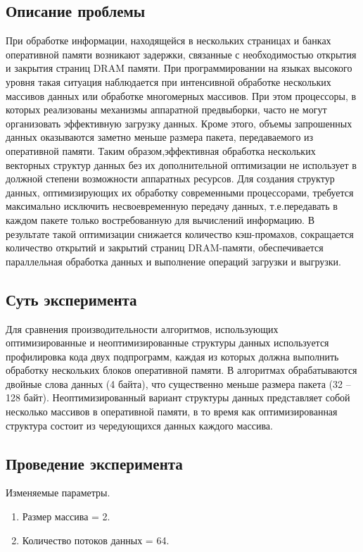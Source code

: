 \subsection{Описание проблемы}
При   обработке информации, находящейся в нескольких страницах и банках оперативной памяти возникают задержки, связанные с необходимостью открытия и закрытия страниц DRAM памяти. При программировании на языках высокого уровня такая ситуация наблюдается при интенсивной обработке нескольких массивов данных   или   обработке   многомерных   массивов.   При   этом   процессоры,   в   которых реализованы   механизмы   аппаратной   предвыборки,   часто   не   могут   организовать эффективную загрузку данных. Кроме этого, объемы запрошенных данных оказываются заметно меньше размера пакета, передаваемого из оперативной памяти. Таким образом,эффективная обработка нескольких векторных структур данных без их дополнительной оптимизации не использует в должной степени возможности аппаратных ресурсов. Для создания структур данных, оптимизирующих их обработку   современными процессорами, требуется максимально исключить несвоевременную передачу данных, т.е.передавать в каждом пакете только востребованную для вычислений информацию. В результате   такой   оптимизации   снижается   количество   кэш-промахов,   сокращается количество открытий и закрытий страниц  DRAM-памяти, обеспечивается параллельная обработка данных и выполнение операций загрузки и выгрузки.

\subsection{Суть эксперимента}  
Для сравнения производительности алгоритмов, использующих оптимизированные и неоптимизированные структуры данных используется профилировка кода двух подпрограмм, каждая из которых должна выполнить обработку нескольких блоков оперативной памяти. В алгоритмах обрабатываются двойные слова данных (4 байта), что существенно меньше размера пакета (32 – 128 байт). Неоптимизированный вариант структуры данных представляет собой несколько массивов в оперативной памяти, в то время как оптимизированная структура состоит из чередующихся данных каждого массива. 


\subsection{Проведение эксперимента}

Изменяемые параметры.

\begin{enumerate}
	\item Размер массива = 2.
	\item Количество потоков данных = 64.
\end{enumerate}

